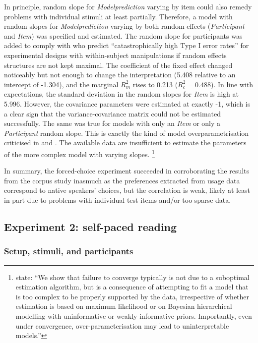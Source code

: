 In principle, random slope for \textit{Modelprediction} varying by item could also remedy problems with individual stimuli at least partially.
Therefore, a model with random slopes for \textit{Modelprediction} varying by both random effects (\textit{Participant} and \textit{Item}) was specified and estimated.
The random slope for participants was added to comply with \citet[257]{BarrEa2013} who predict ``catastrophically high Type I error rates'' for experimental designs with within-subject manipulations if random effects structures are not kept maximal.
The coefficient of the fixed effect changed noticeably but not enough to change the interpretation (5.408 relative to an intercept of -1.304), and the marginal $R^2_m$ rises to 0.213 ($R^2_c=0.488$).
In line with expectations, the standard deviation in the random slopes for \textit{Item} is high at 5.996.
However, the covariance parameters were estimated at exactly -1, which is a clear sign that the variance-covariance matrix could not be estimated successfully.
The same was true for models with only an \textit{Item} or only a \textit{Participant} random slope.
This is exactly the kind of model overparametrisation criticised in \citet{BatesEa2015a} and \citet{MatuschekEa2017}.
The available data are insufficient to estimate the parameters of the more complex model with varying slopes.%
\footnote{\citet[1]{BatesEa2015a} state: ``We show that failure to converge typically is not due to a suboptimal estimation algorithm, but is a consequence of attempting to fit a model that is too complex to be properly supported by the data, irrespective of whether estimation is based on maximum likelihood or on Bayesian hierarchical modelling with uninformative or weakly informative priors.
Importantly, even under convergence, over-parameterisation may lead to uninterpretable models.''
}

In summary, the forced-choice experiment succeeded in corroborating the results from the corpus study inasmuch as the preferences extracted from usage data correspond to native speakers' choices, but the correlation is weak, likely at least in part due to problems with individual test items and\slash or too sparse data.


\subsection{Experiment 2: self-paced reading}
\label{sec:exp:spr}

\subsubsection{Setup, stimuli, and participants}

